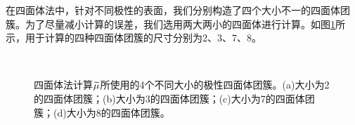 在四面体法中，针对不同极性的表面，我们分别构造了四个大小不一的四面体团簇。为了尽量减小计算的误差，我们选用两大两小的四面体进行计算。如图\ref{fig:IS_structure_cluster}所示，用于计算的四种四面体团簇的尺寸分别为2、3、7、8。

\begin{figure}[htb]
    \\[-0.5ex]
    \caption{四面体法计算$\it \widetilde{\mu}_{\rm }^{\rm } \it$所使用的4个不同大小的极性四面体团簇。(a)大小为2的四面体团簇；(b)大小为3的四面体团簇；(c)大小为7的四面体团簇；(d)大小为8的四面体团簇。}
    \label{fig:IS_structure_cluster}
\end{figure}

